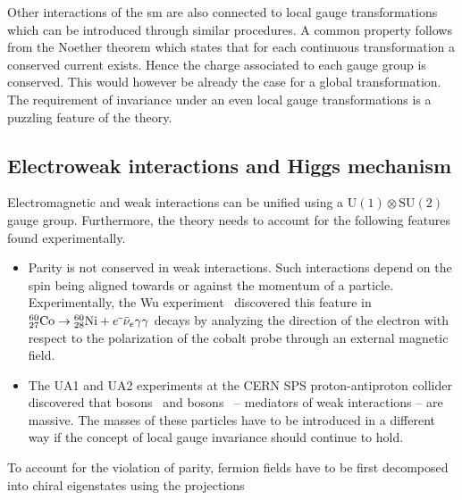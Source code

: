 Other interactions of the \gls{sm} are also connected to local gauge transformations which can be introduced through similar procedures. A common property follows from the Noether theorem which states that for each continuous transformation a conserved current exists. Hence the charge associated to each gauge group is conserved. This would however be already the case for a global transformation. The requirement of invariance under an even local gauge transformations is a puzzling feature of the theory. 

\subsection{Electroweak interactions and Higgs mechanism}
\label{sec:theory-ewk}

Electromagnetic and weak interactions can be unified using a $\mathrm{U(1)}\otimes \mathrm{SU(2)}$ gauge group. Furthermore, the theory needs to account for the following features found experimentally.

\begin{itemize}

\item Parity is not conserved in weak interactions. Such interactions depend on the spin being aligned towards or against the momentum of a particle. Experimentally, the Wu experiment~\cite{PhysRev.105.1413} discovered this feature in ${}_{27}^{60}\mathrm{Co}\to{}_{28}^{60}\mathrm{Ni}+e^{\rmminus}\bar{\nu}_{e}\gamma\gamma$ decays by analyzing the direction of the electron with respect to the polarization of the cobalt probe through an external magnetic field. 

\item The UA1 and UA2 experiments at the CERN SPS proton-antiproton collider discovered that \wboson bosons~\cite{Arnison:1983rp,Banner:1983jy} and \zboson bosons~\cite{Arnison:1983mk,Bagnaia:1983zx} -- mediators of weak interactions -- are massive. The masses of these particles have to be introduced in a different way if the concept of local gauge invariance should continue to hold.

\end{itemize}

To account for the violation of parity, fermion fields have to be first decomposed into chiral eigenstates using the projections

